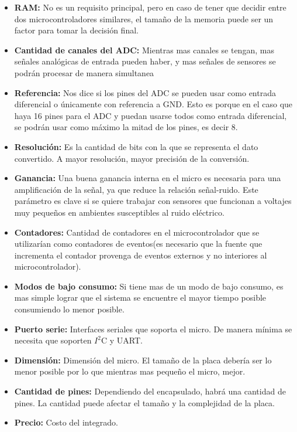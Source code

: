 \begin{itemize}
  \item \textbf{RAM:} No es un requisito principal, pero en caso de tener que decidir entre dos microcontroladores similares, el tamaño de la memoria puede ser un factor para tomar la decisión final.
  \item \textbf{Cantidad de canales del ADC:} Mientras mas canales se tengan, mas señales analógicas de entrada pueden haber, y mas señales de sensores se podrán procesar de manera simultanea
  \item \textbf{Referencia:} Nos dice si los pines del ADC se pueden usar como entrada diferencial o únicamente con referencia a GND. Esto es porque en el caso que haya 16 pines para el ADC y puedan usarse todos como entrada diferencial, se podrán usar como máximo la mitad de los pines, es decir 8.
  \item \textbf{Resolución:} Es la cantidad de bits con la que se representa el dato convertido. A mayor resolución, mayor precisión de la conversión.
  \item \textbf{Ganancia:} Una buena ganancia interna en el micro es necesaria para una amplificación de la señal, ya que reduce la relación señal-ruido. Este parámetro es clave si se quiere trabajar con sensores que funcionan a voltajes muy pequeños en ambientes susceptibles al ruido eléctrico.
  \item \textbf{Contadores:} Cantidad de contadores en el microcontrolador que se utilizarían como contadores de eventos(es necesario que la fuente que incrementa el contador provenga de eventos externos y no interiores al microcontrolador).
  \item \textbf{Modos de bajo consumo:} Si tiene mas de un modo de bajo consumo, es mas simple lograr que el sistema se encuentre el mayor tiempo posible consumiendo lo menor posible.
  \item \textbf{Puerto serie:} Interfaces seriales que soporta el micro. De manera mínima se necesita que soporten $I^{2}$C y UART.
  \item \textbf{Dimensión:} Dimensión del micro. El tamaño de la placa debería ser lo menor posible por lo que mientras mas pequeño el micro, mejor.
  \item \textbf{Cantidad de pines:} Dependiendo del encapsulado, habrá una cantidad de pines. La cantidad puede afectar el tamaño y la complejidad de la placa.
  \item \textbf{Precio:} Costo del integrado.
\end{itemize}

